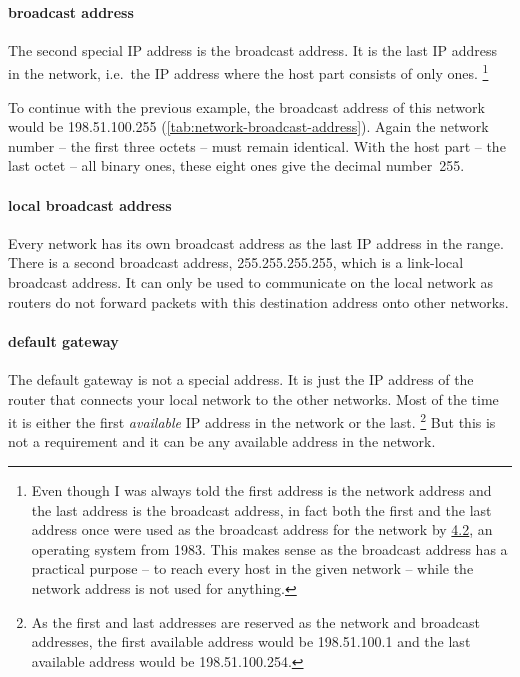 \paragraph{broadcast address}
The second special \acs{IP} address is the broadcast address.
It is the last \acs{IP} address in the network, i.e.~the \acs{IP} address where the host part consists of only ones.%
\footnote{%
   Even though I was always told the first address is the network address and the last address is the broadcast address, in fact both the first and the last address once were used as the broadcast address for the network by \href{https://github.com/schoen/unicast-extensions/blob/master/LOWEST.md}{4.2}, an operating system from 1983.
   This makes sense as the broadcast address has a practical purpose -- to reach every host in the given network -- while the network address is not used for anything.
}

To continue with the previous example, the broadcast address of this network would be 198.51.100.255 (\vref{tab:network-broadcast-address}).
Again the network number -- the first three octets -- must remain identical.
With the host part -- the last octet -- all binary ones, these eight ones give the decimal number~255.

\paragraph{local broadcast address}
Every network has its own broadcast address as the last \acs{IP} address in the range.
There is a second broadcast address, 255.255.255.255, which is a link-local broadcast address.
It can only be used to communicate on the local network as routers do not forward packets with this destination address onto other networks.

\paragraph{default gateway}
The default gateway is not a special address.
It is just the \acs{IP} address of the router that connects your local network to the other networks.
Most of the time it is either the first \emph{available}
\acs{IP} address in the network or the last.%
   \footnote{As the first and last addresses are reserved as the network and broadcast addresses, the first available address would be 198.51.100.1 and the last available address would be 198.51.100.254.}
But this is not a requirement and it can be any available address in the network.


